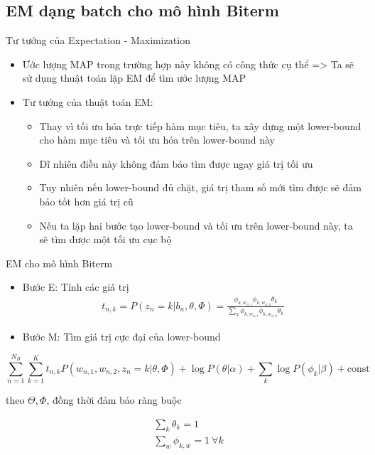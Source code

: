 \documentclass[pdf]{beamer}
\begin{document}
\subsection{EM dạng batch cho mô hình Biterm}

\begin{frame}{Tư tưởng của Expectation - Maximization}
	\begin{itemize}
		\item Ước lượng MAP trong trường hợp này không có công thức cụ thể
		=> Ta sẽ sử dụng thuật toán lặp EM để tìm ước lượng MAP
		\item Tư tưởng của thuật toán EM:
			\begin{itemize}
				\item Thay vì tối ưu hóa trực tiếp hàm mục tiêu, ta xây dựng một lower-bound cho hàm mục tiêu và tối ưu hóa trên lower-bound này
				\item Dĩ nhiên điều này không đảm bảo tìm được ngay giá trị tối ưu
				\item Tuy nhiên nếu lower-bound đủ chặt, giá trị tham số mới tìm được sẽ đảm bảo tốt hơn giá trị cũ 
				\item Nếu ta lặp hai bước tạo lower-bound và tối ưu trên lower-bound này, ta sẽ tìm được một tối ưu cục bộ
			\end{itemize}
	\end{itemize}
\end{frame}

\begin{frame}{EM cho mô hình Biterm}
	\begin{itemize}
		\item Bước E: Tính các giá trị
			\begin{align}
				t_{n,k} = P(z_{n} = k |b_{n},\theta,\Phi) = \frac{\phi_{k,w_{n,1}} \phi_{k,w_{n,2}} \theta_k}{\sum_k \phi_{k,w_{n,1}} \phi_{k,w_{n,2}} \theta_k}
			\end{align}
			
		\item Bước M: Tìm giá trị cực đại của lower-bound
	\end{itemize}
			\begin{equation}
				\sum_{n=1}^{N_{B}} \sum_{k=1}^{K} t_{n,k}P(w_{n,1},w_{n,2},z_{n}=k|\theta,\Phi) + \log P(\theta|\alpha) + \sum_{k} \log P(\phi_{k}|\beta) + \text{const} \label{eq:mBTM}
			\end{equation}

			theo $\Theta, \Phi$, đồng thời đảm bảo ràng buộc

			\begin{align}
				&\sum_k \theta_k = 1\\
				&\sum_w \phi_{k,w} = 1\ \forall k
			\end{align}
			
	
\end{frame}
\end{document}
